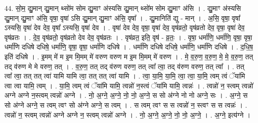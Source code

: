 \documentclass[17pt]{extarticle}
\begin{document}
44. सो॒म॒ द्यु॒मान् द्यु॒मान् थ्सो॑म सोम द्यु॒माꣳ अ॑स्यसि द्यु॒मान् थ्सो॑म सोम द्यु॒माꣳ अ॑सि । . द्यु॒माꣳ अ॑स्यसि द्यु॒मान् द्यु॒माꣳ अ॑सि॒ वृषा॒ वृषा॑ ऽसि द्यु॒मान् द्यु॒माꣳ अ॑सि॒ वृषा᳚ । . द्यु॒मानिति॑ द्यु - मान् । . अ॒सि॒ वृषा॒ वृषा᳚ ऽस्यसि॒ वृषा॑ देव देव॒ वृषा᳚ ऽस्यसि॒ वृषा॑ देव । . वृषा॑ देव देव॒ वृषा॒ वृषा॑ देव॒ वृष॑व्रतो॒ वृष॑व्रतो देव॒ वृषा॒ वृषा॑ देव॒ वृष॑व्रतः । . दे॒व॒ वृष॑व्रतो॒ वृष॑व्रतो देव देव॒ वृष॑व्रतः । . वृष॑व्रत॒ इति॒ वृष॑ - व्र॒तः॒ । . वृषा॒ धर्मा॑णि॒ धर्मा॑णि॒ वृषा॒ वृषा॒ धर्मा॑णि दधिषे दधिषे॒ धर्मा॑णि॒ वृषा॒ वृषा॒ धर्मा॑णि दधिषे । . धर्मा॑णि दधिषे दधिषे॒ धर्मा॑णि॒ धर्मा॑णि दधिषे । . द॒धि॒ष॒ इति॑ दधिषे । . इ॒मम् मे॑ म इ॒म मि॒मम् मे॑ वरुण वरुण म इ॒म मि॒मम् मे॑ वरुण । . मे॒ व॒रु॒ण॒ व॒रु॒ण॒ मे॒ मे॒ व॒रु॒ण॒ तत् तद् व॑रुण मे मे वरुण॒ तत् । . व॒रु॒ण॒ तत् तद् व॑रुण वरुण॒ तत् त्वा᳚ त्वा॒ तद् व॑रुण वरुण॒ तत् त्वा᳚ । . तत् त्वा᳚ त्वा॒ तत् तत् त्वा॑ यामि यामि त्वा॒ तत् तत् त्वा॑ यामि । . त्वा॒ या॒मि॒ या॒मि॒ त्वा॒ त्वा॒ या॒मि॒ त्वम् त्वं ॅया॑मि त्वा त्वा यामि॒ त्वम् । . या॒मि॒ त्वम् त्वं ॅया॑मि यामि॒ त्वन्नो॑ न॒स्त्वं ॅया॑मि यामि॒ त्वन्नः॑ । . त्वन्नो॑ न॒ स्त्वम् त्वन्नो॑ अग्ने अग्ने न॒स्त्वम् त्वन्नो॑ अग्ने । . नो॒ अ॒ग्ने॒ अ॒ग्ने॒ नो॒ नो॒ अ॒ग्ने॒ स सो अ॑ग्ने नो नो अग्ने॒ सः । . अ॒ग्ने॒ स सो अ॑ग्ने अग्ने॒ स त्वम् त्वꣳ सो अ॑ग्ने अग्ने॒ स त्वम् । . स त्वम् त्वꣳ स स त्वन्नो॑ न॒ स्त्वꣳ स स त्वन्नः॑ । . त्वन्नो॑ न॒ स्त्वम् त्वन्नो॑ अग्ने अग्ने न॒ स्त्वम् त्वन्नो॑ अग्ने । . नो॒ अ॒ग्ने॒ अ॒ग्ने॒ नो॒ नो॒ अ॒ग्ने॒ । . अ॒ग्ने॒ इत्य॑ग्ने । \newline
\pagebreak
\end{document}
